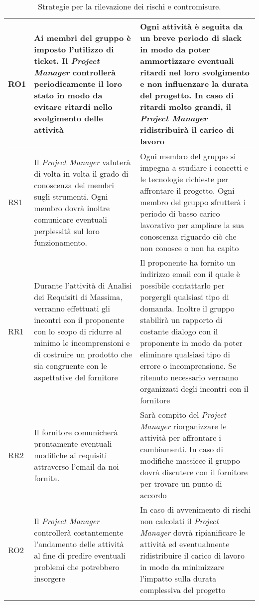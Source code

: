 \begin{longtable}[H]{|l|C{5cm}|C{7cm}|}
		\hline
		RO1     & Ai membri del gruppo è imposto l'utilizzo di ticket. Il \emph{Project Manager} controllerà periodicamente il loro stato in modo da evitare ritardi nello svolgimento delle attività & Ogni attività è seguita da un breve periodo di slack in modo da poter ammortizzare eventuali ritardi nel loro svolgimento e non influenzare la durata del progetto. In caso di ritardi molto grandi, il \emph{Project Manager} ridistribuirà il carico di lavoro\\  
		\hline
		RS1     & Il \emph{Project Manager} valuterà di volta in volta il grado di conoscenza dei membri sugli strumenti. Ogni membro dovrà inoltre comunicare eventuali perplessità sul loro funzionamento. & Ogni membro del gruppo si impegna a studiare i concetti e le tecnologie richieste per affrontare il progetto. Ogni membro del gruppo sfrutterà i periodo di basso carico lavorativo per ampliare la sua conoscenza riguardo ciò che non conosce o non ha capito\\
		\hline
		RR1     & Durante l'attività di Analisi dei Requisiti di Massima, verranno effettuati gli incontri con il proponente con lo scopo di ridurre al minimo le incomprensioni e di costruire un prodotto che sia congruente con le aspettative del fornitore  & Il proponente ha fornito un indirizzo email con il quale è possibile contattarlo per porgergli qualsiasi tipo di domanda. Inoltre il gruppo stabilirà un rapporto di costante dialogo con il proponente in modo da poter eliminare qualsiasi tipo di errore o incomprensione. Se ritenuto necessario verranno organizzati degli incontri con il fornitore\\
		\hline
		RR2 & Il fornitore comunicherà prontamente eventuali modifiche ai requisiti attraverso l'email da noi fornita. & Sarà compito del \emph{Project Manager} riorganizzare le attività per affrontare i cambiamenti. In caso di modifiche massicce il gruppo dovrà discutere con il fornitore per trovare un punto di accordo\\
		\hline                                                                                                                           
		RO2 & Il \emph{Project Manager} controllerà costantemente l'andamento delle attività al fine di predire eventuali problemi che potrebbero insorgere & In caso di avvenimento di rischi non calcolati il \emph{Project Manager} dovrà ripianificare le attività ed eventualmente ridistribuire il carico di lavoro in modo da minimizzare l'impatto sulla durata complessiva del progetto\\
		\hline
		\caption{Strategie per la rilevazione dei rischi e contromisure.}
\end{longtable}






